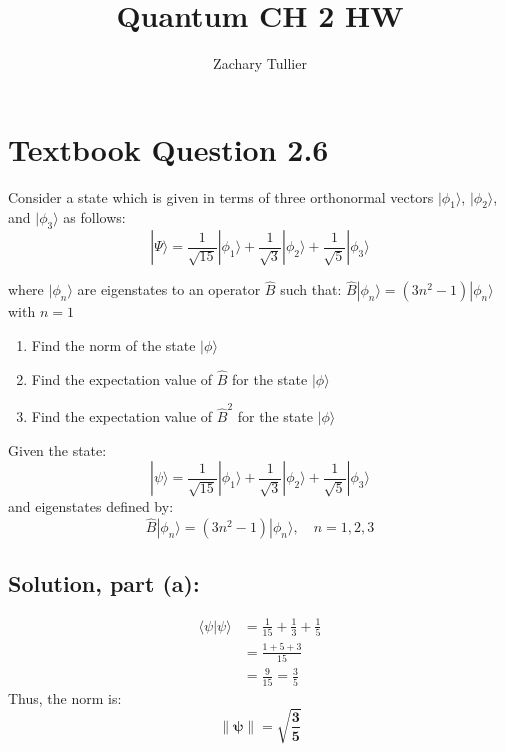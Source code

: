 \documentclass[12pt]{article}
\begin{document}
\singlespacing  %
\title{Quantum CH 2 HW}

\author[1]{Zachary Tullier}
\date{}
\maketitle

\section{Textbook Question 2.6}
    Consider a state which is given in terms of three orthonormal vectors $|\phi_1\rangle$, $|\phi_2\rangle$, and $|\phi_3\rangle$ as follows:
    \begin{equation}
        |\Psi\rangle = \frac{1}{\sqrt{15}} |\phi_1\rangle + \frac{1}{\sqrt{3}} |\phi_2\rangle + \frac{1}{\sqrt{5}} |\phi_3\rangle
    \end{equation}

    where $|\phi_n\rangle$ are eigenstates to an operator $\hat{ B}$ such that: $\hat{B} |\phi_n\rangle = (3n^2-1) |\phi_n\rangle$ with $n=1$
    \begin{enumerate}
        \item [(a)] Find the norm of the state $|\phi\rangle$
        \item [(b)] Find the expectation value of $\hat{B}$ for the state $|\phi\rangle$
        \item [(c)] Find the expectation value of $\hat{B}^2$ for the state $|\phi\rangle$
    \end{enumerate}
    
    
    
    

    Given the state:
    \[
    |\psi\rangle = \frac{1}{\sqrt{15}}|\phi_1\rangle + \frac{1}{\sqrt{3}}|\phi_2\rangle + \frac{1}{\sqrt{5}}|\phi_3\rangle
    \]
    and eigenstates defined by:
    \[
    \hat{B}|\phi_n\rangle = (3n^2 - 1)|\phi_n\rangle,\quad n=1,2,3
    \]

    \subsection{Solution, part (a):}
        \begin{align*}
        \langle\psi|\psi\rangle &= \frac{1}{15} + \frac{1}{3} + \frac{1}{5} \\
        &= \frac{1 + 5 + 3}{15} \\
        &= \frac{9}{15} = \frac{3}{5}
        \end{align*}
        Thus, the norm is:
        \[
        \boldsymbol{\|\psi\| = \sqrt{\frac{3}{5}}}
        \]
\end{document}
